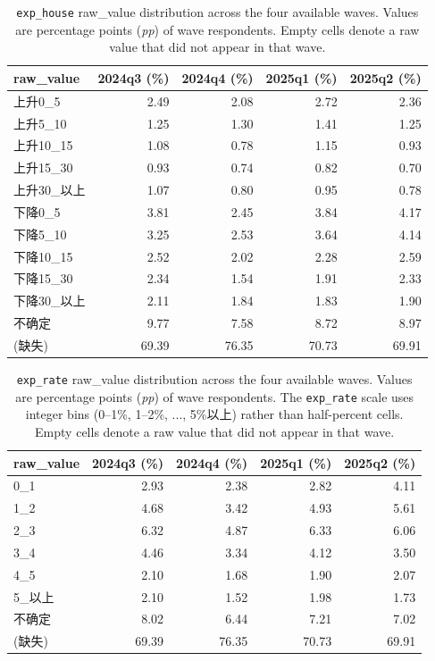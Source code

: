 \documentclass[11pt,letterpaper,english,final]{article}
\begin{document}
\begin{table}[H]
\centering
\small
\setlength{\tabcolsep}{6pt}
\caption{\texttt{exp\_house} raw\_value distribution across the four available waves. Values are percentage points (\textit{pp}) of wave respondents. Empty cells denote a raw value that did not appear in that wave.}
\label{tab:exp_house_dist}
\begin{tabular}{@{}l r r r r@{}}
\toprule
{raw\_value} & {2024q3 (\%)} & {2024q4 (\%)} & {2025q1 (\%)} & {2025q2 (\%)} \\
\midrule
上升0\_5     & 2.49  & 2.08  & 2.72  & 2.36  \\
上升5\_10    & 1.25  & 1.30  & 1.41  & 1.25  \\
上升10\_15   & 1.08  & 0.78  & 1.15  & 0.93  \\
上升15\_30   & 0.93  & 0.74  & 0.82  & 0.70  \\
上升30\_以上 & 1.07  & 0.80  & 0.95  & 0.78  \\
下降0\_5     & 3.81  & 2.45  & 3.84  & 4.17  \\
下降5\_10    & 3.25  & 2.53  & 3.64  & 4.14  \\
下降10\_15   & 2.52  & 2.02  & 2.28  & 2.59  \\
下降15\_30   & 2.34  & 1.54  & 1.91  & 2.33  \\
下降30\_以上 & 2.11  & 1.84  & 1.83  & 1.90  \\
不确定       & 9.77  & 7.58  & 8.72  & 8.97  \\
\midrule
(缺失)       & 69.39 & 76.35 & 70.73 & 69.91 \\
\bottomrule
\end{tabular}
\end{table}

\begin{table}[H]
\centering
\small
\setlength{\tabcolsep}{6pt}
\caption{\texttt{exp\_rate} raw\_value distribution across the four available waves. Values are percentage points (\textit{pp}) of wave respondents. The \texttt{exp\_rate} scale uses integer bins (0--1\%, 1--2\%, ..., 5\%以上) rather than half-percent cells. Empty cells denote a raw value that did not appear in that wave.}
\label{tab:exp_rate_dist}
\begin{tabular}{@{}l r r r r@{}}
\toprule
{raw\_value} & {2024q3 (\%)} & {2024q4 (\%)} & {2025q1 (\%)} & {2025q2 (\%)} \\
\midrule
0\_1     & 2.93  & 2.38  & 2.82  & 4.11  \\
1\_2     & 4.68  & 3.42  & 4.93  & 5.61  \\
2\_3     & 6.32  & 4.87  & 6.33  & 6.06  \\
3\_4     & 4.46  & 3.34  & 4.12  & 3.50  \\
4\_5     & 2.10  & 1.68  & 1.90  & 2.07  \\
5\_以上  & 2.10  & 1.52  & 1.98  & 1.73  \\
不确定   & 8.02  & 6.44  & 7.21  & 7.02  \\
\midrule
(缺失)   & 69.39 & 76.35 & 70.73 & 69.91 \\
\bottomrule
\end{tabular}
\end{table}
\end{document}
